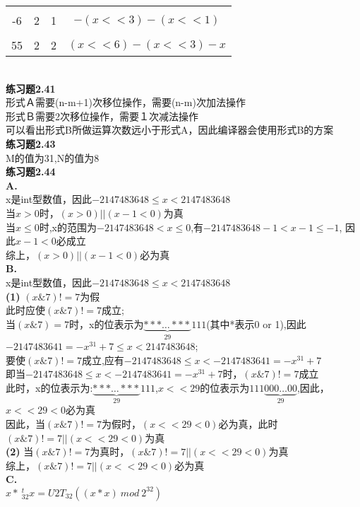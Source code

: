\documentclass{article}
\begin{document}
\begin{CJK}{UTF8}{uyhei}
\begin{tabular}[t]{|c|c|c|c|}
	\hline		\\[-2ex]
	-6	&	2	&	1		&	$-(x<<3)-(x<<1)$	\\
	\hline		\\[-2ex]
	55	&	2	&	2		&	$(x<<6)-(x<<3)-x$	\\
	\hline
\end{tabular}	\\[3ex]
\textbf{练习题2.41}	\\[1ex]
形式Ａ需要(n-m+1)次移位操作，需要(n-m)次加法操作	\\
形式Ｂ需要2次移位操作，需要１次减法操作	\\
可以看出形式B所做运算次数远小于形式A，因此编译器会使用形式B的方案	\\[3ex]
\textbf{练习题2.43}		\\[1ex]
M的值为31,N的值为8	\\[3ex]
\textbf{练习题2.44}	\\[1ex]
\textbf{A.}	\\
x是int型数值，因此$-2147483648\le x< 2147483648$	\\
当$x>0$时，$(x>0)||(x-1<0)$为真	\\
当$x\le 0$时,x的范围为$-2147483648<x\le 0$,有$-2147483648-1<x-1\le -1$, 因此$x-1<0$必成立	\\
综上，$(x>0)||(x-1<0)$必为真	\\
\textbf{B.} 	\\[1ex]
x是int型数值，因此$-2147483648\le x< 2147483648$	\\
\textbf{(1)} $(x\&7)!=7$为假	\\
此时应使$(x\&7)!=7$成立;	\\
当$(x\&7)=7$时，x的位表示为$\underbrace{***\dots***}_{29}111$(其中*表示0 or 1),因此$-2147483641=-x^{31}+7\le x< 2147483648$;	\\
要使$(x\&7)!=7$成立,应有$-2147483648\le x<-2147483641=-x^{31}+7$	\\
即当$-2147483648\le x<-2147483641=-x^{31}+7$时，$(x\&7)!=7$成立	\\
此时，x的位表示为:$\underbrace{***\dots***}_{29}111$,$x<<29$的位表示为$111\underbrace{000\dots00}_{29}$,因此，$x<<29<0$必为真	\\
因此，当$(x\&7)!=7$为假时，$(x<<29<0)$必为真，此时$(x\&7)!=7||(x<<29<0)$为真	\\
\textbf{(2)} 当$(x\&7)!=7$为真时，$(x\&7)!=7||(x<<29<0)$为真	\\
综上，$(x\&7)!=7||(x<<29<0)$必为真	\\
\textbf{C.}	\\
$x*\ _{32}^tx=U2T_{32}\left( (x*x)\ mod\ 2^{32} \right)$	\\

\end{CJK}
\end{document}
